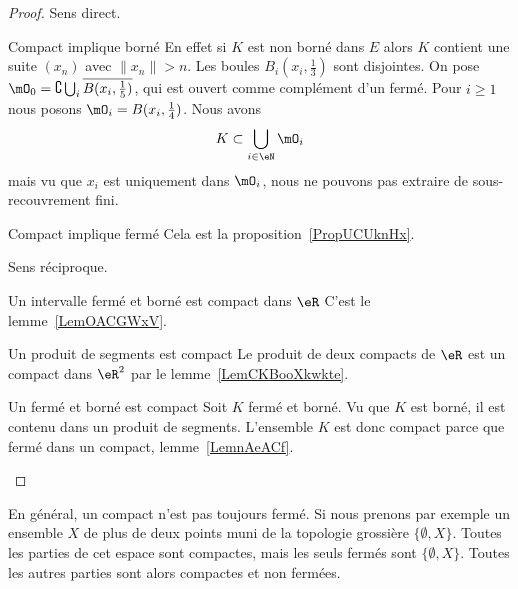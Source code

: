 \begin{proof}
    Sens direct.
    \begin{subproof}
    \item[Compact implique borné]
        En effet si \( K\) est non borné dans \( E\) alors \( K\) contient une suite \( (x_n)\) avec \( \| x_n \|>n\). Les boules \( B_i(x_i,\frac{ 1 }{3})\) sont disjointes. On pose \( \mO_0=\complement\bigcup_i\overline{ B(x_i,\frac{1}{ 5 }) }\), qui est ouvert comme complément d'un fermé. Pour \( i\geq 1\) nous posons \( \mO_i=B(x_i,\frac{1}{ 4 })\). Nous avons
        \begin{equation}
            K\subset\bigcup_{i\in \eN}\mO_i
        \end{equation}
        mais vu que \( x_i\) est uniquement dans \( \mO_i\), nous ne pouvons pas extraire de sous-recouvrement fini.
    \item[Compact implique fermé]
        Cela est la proposition~\ref{PropUCUknHx}.
    \end{subproof}
    Sens réciproque.
    \begin{subproof}
    \item[Un intervalle fermé et borné est compact dans \( \eR\)]
        C'est le lemme~\ref{LemOACGWxV}.
    \item[Un produit de segments est compact]
        Le produit de deux compacts de \( \eR\) est un compact dans \( \eR^2\) par le lemme~\ref{LemCKBooXkwkte}.
    \item[Un fermé et borné est compact]
        Soit \( K\) fermé et borné. Vu que \( K\) est borné, il est contenu dans un produit de segments. L'ensemble \( K\) est donc compact parce que fermé dans un compact, lemme~\ref{LemnAeACf}.
    \end{subproof}
\end{proof}

\begin{example}
    En général, un compact n'est pas toujours fermé. Si nous prenons par exemple un ensemble \( X\) de plus de deux points muni de la topologie grossière \( \{ \emptyset,X \}\). Toutes les parties de cet espace sont compactes, mais les seuls fermés sont \( \{ \emptyset,X \}\). Toutes les autres parties sont alors compactes et non fermées.
\end{example}

